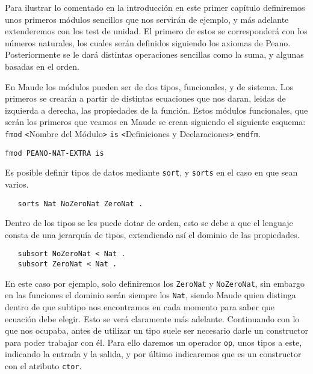 
Para ilustrar lo comentado en la introducción en este primer capítulo definiremos unos primeros módulos sencillos que nos servirán de ejemplo, y más adelante extenderemos con los test de unidad.
El primero de estos se corresponderá con los números naturales, los cuales serán definidos siguiendo los axiomas de Peano. Posteriormente se le dará distintas operaciones sencillas como la suma, y algunas basadas en el orden.\par

En Maude los módulos pueden ser de dos tipos, funcionales, y de sistema. Los primeros se crearán a partir de distintas ecuaciones que nos daran, leidas de izquierda a derecha, las propiedades de la función. Estos módulos funcionales, que serán los primeros que veamos en Maude se crean siguiendo el siguiente esquema: \texttt{fmod} \verb"<"Nombre del Módulo\verb">" \texttt{is} \verb"<"Definiciones y Declaraciones\verb">" \texttt{endfm}.\par

{\codesize
\begin{verbatim}
fmod PEANO-NAT-EXTRA is
\end{verbatim}
}

Es posible definir tipos de datos mediante \texttt{sort}, y \texttt{sorts} en el caso en que sean varios. \par

{\codesize
\begin{verbatim}
   sorts Nat NoZeroNat ZeroNat .
\end{verbatim}
}

Dentro de los tipos se les puede dotar de orden, esto se debe a que el lenguaje consta de una jerarquía de tipos, extendiendo así el dominio de las propiedades. \par

{\codesize
\begin{verbatim}
   subsort NoZeroNat < Nat .
   subsort ZeroNat < Nat .
\end{verbatim}
}

En este caso por ejemplo, solo definiremos los \texttt{ZeroNat} y \texttt{NoZeroNat}, sin embargo en las funciones el dominio serán siempre los \texttt{Nat}, siendo Maude quien distinga dentro de que subtipo nos encontramos en cada momento para saber que ecuación debe elegir. Esto se verá claramente más adelante. Continuando con lo que nos ocupaba, antes de utilizar un tipo suele ser necesario darle un constructor para poder trabajar con él. Para ello daremos un operador \texttt{op}, unos tipos a este, indicando la entrada y la salida, y por último indicaremos que es un constructor con el atributo \texttt{ctor}. \par

